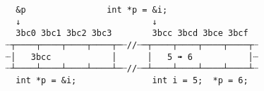 \documentclass[varwidth=20cm,crop]{standalone}
\begin{document}
\begin{verbatim}
  &p                int *p = &i;
  ↓                          ↓
  3bc0 3bc1 3bc2 3bc3        3bcc 3bcd 3bce 3bcf
┈┬────┬────┬────┬────┬─┈//┈─┬────┬────┬────┬────┬┈
┈│   3bcc            │      │   5 ➠ 6           │┈
┈┴────┴────┴────┴────┴─┈//┈─┴────┴────┴────┴────┴┈
  int *p = &i;               int i = 5;  *p = 6; 
\end{verbatim}
\end{document}
